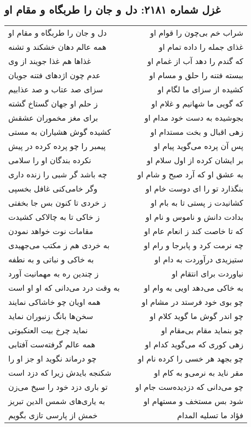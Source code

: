 \begin{center}
\section*{غزل شماره ۲۱۸۱: دل و جان را طربگاه و مقام او}
\label{sec:2181}
\begin{longtable}{l p{0.5cm} r}
دل و جان را طربگاه و مقام او
&&
شراب خم بی‌چون را قوام او
\\
همه عالم دهان خشکند و تشنه
&&
غذای جمله را داده تمام او
\\
غذاها هم غذا جویند از وی
&&
که گندم را دهد آب از غمام او
\\
عدم چون اژدهای فتنه جویان
&&
ببسته فتنه را حلق و مسام او
\\
سزای صد عتاب و صد عذابیم
&&
کشیده از سزای ما لگام او
\\
ز حلم او جهان گستاخ گشته
&&
که گویی ما شهانیم و غلام او
\\
برای مغز مخموران عشقش
&&
بجوشیده به دست خود مدام او
\\
کشیده گوش هشیاران به مستی
&&
زهی اقبال و بخت مستدام او
\\
پیمبر را چو پرده کرده در پیش
&&
پس آن پرده می‌گوید پیام او
\\
نکرده بندگان او را سلامی
&&
بر ایشان کرده از اول سلام او
\\
چه باشد گر شبی را زنده داری
&&
به عشق او که آرد صبح و شام او
\\
وگر خامی‌کنی غافل بخسپی
&&
بنگذارد تو را ای دوست خام او
\\
ز خردی تا کنون بس جا بخفتی
&&
کشانیدت ز پستی تا به بام او
\\
ز خاکی تا به چالاکی کشیدت
&&
بدادت دانش و ناموس و نام او
\\
مقامات نوت خواهد نمودن
&&
که تا خاصت کند ز انعام عام او
\\
به خردی هم ز مکتب می‌جهیدی
&&
چه نرمت کرد و پابرجا و رام او
\\
به خاکی و نباتی و به نطفه
&&
ستیزیدی درآوردت به دام او
\\
ز چندین ره به مهمانیت آورد
&&
نیاوردت برای انتقام او
\\
به وقت درد می‌دانی که او او است
&&
به خاکی می‌دهد اویی به وام او
\\
همه اویان چو خاشاکی نمایند
&&
چو بوی خود فرستد در مشام او
\\
سخن‌ها بانگ زنبوران نماید
&&
چو اندر گوش ما گوید کلام او
\\
نماید چرخ بیت العنکبوتی
&&
چو بنماید مقام بی‌مقام او
\\
همه عالم گرفته‌ست آفتابی
&&
زهی کوری که می‌گوید کدام او
\\
چو درماند نگوید او جز او را
&&
چو بجهد هر خسی را کرده نام او
\\
شکنجه بایدش زیرا که دزد است
&&
مقر ناید به نرمی‌و به کام او
\\
تو باری دزد خود را سیخ می‌زن
&&
چو می‌دانی که دزدیده‌ست جام او
\\
به یاری‌های شمس الدین تبریز
&&
شود بس مستخف و مستهام او
\\
خمش از پارسی تازی بگویم
&&
فؤاد ما تسلیه المدام
\\
\end{longtable}
\end{center}
